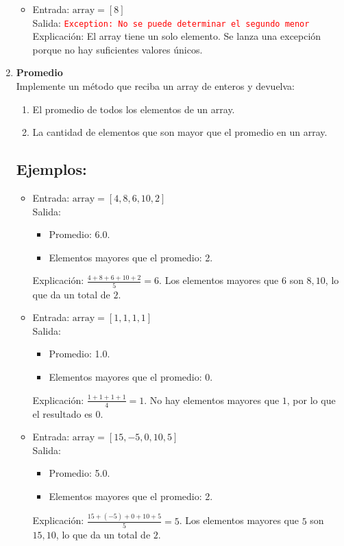 \begin{enumerate}
\begin{itemize}
        \item Entrada: \( \text{array} = [8] \)\\
        Salida: \textcolor{red}{\texttt{Exception: No se puede determinar el segundo menor}}\\
        Explicación: El array tiene un solo elemento. Se lanza una excepción porque no hay suficientes valores únicos.
    \end{itemize}

    \item \textbf{Promedio}\\
    Implemente un método que reciba un array de enteros y devuelva: 
    \begin{enumerate}
        \item El promedio de todos los elementos de un array.
        \item La cantidad de elementos que son mayor que el promedio en un array.
    \end{enumerate}
    \subsection*{Ejemplos:}
    \begin{itemize}
        \item Entrada: \( \text{array} = [4, 8, 6, 10, 2] \)\\
        Salida: 
        \begin{itemize}
            \item Promedio: 6.0.
            \item Elementos mayores que el promedio: 2.
        \end{itemize}
        Explicación: \(\frac{4 + 8 + 6 + 10 + 2}{5} = 6\).  
        Los elementos mayores que \( 6 \) son \( 8, 10 \), lo que da un total de \( 2 \).
    
        \item Entrada: \( \text{array} = [1, 1, 1, 1] \)\\
        Salida: 
        \begin{itemize}
            \item Promedio: 1.0.
            \item Elementos mayores que el promedio: 0.
        \end{itemize}
        Explicación: \(\frac{1 + 1 + 1 + 1}{4} = 1\).  
        No hay elementos mayores que \( 1 \), por lo que el resultado es \( 0 \).
    
        \item Entrada: \( \text{array} = [15, -5, 0, 10, 5] \)\\
        Salida: 
        \begin{itemize}
            \item Promedio: 5.0.
            \item Elementos mayores que el promedio: 2.
        \end{itemize}
        Explicación: \(\frac{15 + (-5) + 0 + 10 + 5}{5} = 5\).  
        Los elementos mayores que \( 5 \) son \( 15, 10 \), lo que da un total de \( 2 \).
    

\end{itemize}
\end{enumerate}
